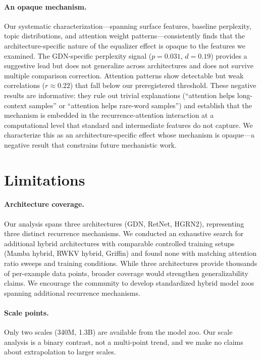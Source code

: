 \documentclass[11pt,a4paper]{article}
\begin{document}
\paragraph{An opaque mechanism.}
Our systematic characterization---spanning surface features, baseline perplexity, topic distributions, and attention weight patterns---consistently finds that the architecture-specific nature of the equalizer effect is opaque to the features we examined. The GDN-specific perplexity signal ($p{=}0.031$, $d{=}0.19$) provides a suggestive lead but does not generalize across architectures and does not survive multiple comparison correction. Attention patterns show detectable but weak correlations ($r \approx 0.22$) that fall below our preregistered threshold. These negative results are informative: they rule out trivial explanations (``attention helps long-context samples'' or ``attention helps rare-word samples'') and establish that the mechanism is embedded in the recurrence-attention interaction at a computational level that standard and intermediate features do not capture. We characterize this as an architecture-specific effect whose mechanism is opaque---a negative result that constrains future mechanistic work.

\section{Limitations}

\paragraph{Architecture coverage.}
Our analysis spans three architectures (GDN, RetNet, HGRN2), representing three distinct recurrence mechanisms. We conducted an exhaustive search for additional hybrid architectures with comparable controlled training setups (Mamba hybrid, RWKV hybrid, Griffin) and found none with matching attention ratio sweeps and training conditions. While three architectures provide thousands of per-example data points, broader coverage would strengthen generalizability claims. We encourage the community to develop standardized hybrid model zoos spanning additional recurrence mechanisms.

\paragraph{Scale points.}
Only two scales (340M, 1.3B) are available from the model zoo. Our scale analysis is a binary contrast, not a multi-point trend, and we make no claims about extrapolation to larger scales.
\end{document}
